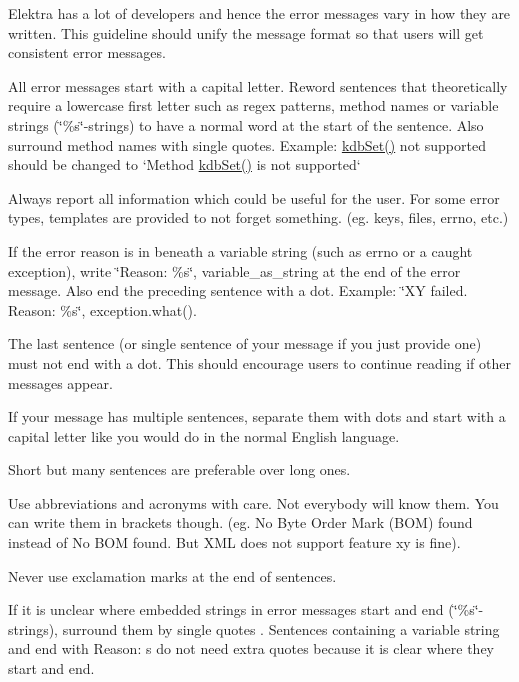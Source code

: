 Elektra has a lot of developers and hence the error messages vary in how they are written. This guideline should unify the message format so that users will get consistent error messages.


\begin{DoxyItemize}
\item All error messages start with a capital letter. Reword sentences that theoretically require a lowercase first letter such as regex patterns, method names or variable strings (\char`\"{}\%s\char`\"{}-\/strings) to have a normal word at the start of the sentence. Also surround method names with single quotes. Example\+: {\ttfamily \hyperlink{group__kdb_ga11436b058408f83d303ca5e996832bcf}{kdb\+Set()} not supported} should be changed to `\+Method \textquotesingle{}\hyperlink{group__kdb_ga11436b058408f83d303ca5e996832bcf}{kdb\+Set()}\textquotesingle{} is not supported`
\item Always report all information which could be useful for the user. For some error types, templates are provided to not forget something. (eg. keys, files, errno, etc.)
\item If the error reason is in beneath a variable string (such as {\ttfamily errno} or a caught exception), write {\ttfamily \char`\"{}\+Reason\+: \%s\char`\"{}, variable\+\_\+as\+\_\+string} at the end of the error message. Also end the preceding sentence with a dot. Example\+: {\ttfamily \char`\"{}\+X\+Y failed. Reason\+: \%s\char`\"{}, exception.\+what()}.
\item The last sentence (or single sentence of your message if you just provide one) must not end with a dot. This should encourage users to continue reading if other messages appear.
\item If your message has multiple sentences, separate them with dots and start with a capital letter like you would do in the normal English language.
\item Short but many sentences are preferable over long ones.
\item Use abbreviations and acronyms with care. Not everybody will know them. You can write them in brackets though. (eg. {\ttfamily No Byte Order Mark (B\+OM) found} instead of {\ttfamily No B\+OM found}. But {\ttfamily X\+ML does not support feature xy} is fine).
\item Never use exclamation marks at the end of sentences.
\item If it is unclear where embedded strings in error messages start and end (\char`\"{}\%s\char`\"{}-\/strings), surround them by single quotes \textquotesingle{}. Sentences containing a variable string and end with {\ttfamily Reason\+: s} do not need extra quotes because it is clear where they start and end.
\end{DoxyItemize}

